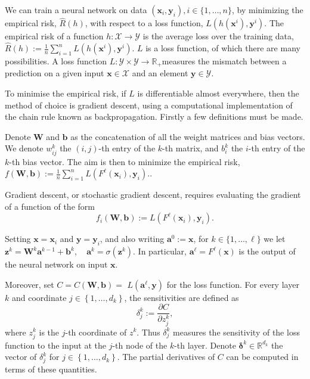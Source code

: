 \documentclass[a4paper,11pt]{article}
\theoremstyle{plain} %
\theoremstyle{definition} %
\theoremstyle{remark} %
\begin{document}
We can train a neural network on data $\left(\boldsymbol{x}_i, \boldsymbol{y}_i\right), i \in\{1, \ldots, n\}$, by minimizing the empirical risk, $
\hat{R}(h)$, with respect to a loss function, $L\left(h\left(\boldsymbol{x}^i\right), \boldsymbol{y}^i\right)$. The empirical risk of a function $h: \mathcal{X} \rightarrow \mathcal{Y}$ is the average loss over the training data,
$
\hat{R}(h):=\frac{1}{n} \sum_{i=1}^n L\left(h\left(\boldsymbol{x}^i\right), \boldsymbol{y}^i\right)
$. $L$ is a loss function, of which there are many possibilities. A loss function $L: \mathcal{Y} \times \mathcal{Y} \rightarrow \mathbb{R}_{+}$measures the mismatch between a prediction on a given input $\boldsymbol{x} \in \mathcal{X}$ and an element $\boldsymbol{y} \in \mathcal{Y}$. 

To minimise the empirical risk, if $L$ is differentiable almost everywhere, then the method of choice is gradient descent, using a computational implementation of the chain rule known as backpropagation. Firstly a few definitions must be made. 

Denote $\boldsymbol{W}$ and $\boldsymbol{b}$ as the concatenation of all the weight matrices and bias vectors. We denote $w_{i j}^k$ the $(i, j)$-th entry of the $k$-th matrix, and $b_i^k$ the $i$-th entry of the $k$-th bias vector. The aim is then to minimize the empirical risk,
$
f(\boldsymbol{W}, \boldsymbol{b}):=\frac{1}{n} \sum_{i=1}^n L\left(F^{\ell}\left(\boldsymbol{x}_i\right), \boldsymbol{y}_i\right) .
$.

Gradient descent, or stochastic gradient descent, requires evaluating the gradient of a function of the form
$$
f_i(\boldsymbol{W}, \boldsymbol{b}):=L\left(F^{\ell}\left(\boldsymbol{x}_i\right), \boldsymbol{y}_i\right) .
$$

Setting $\boldsymbol{x}=\boldsymbol{x}_i$ and $\boldsymbol{y}=\boldsymbol{y}_i$, and also writing $\boldsymbol{a}^0:=\boldsymbol{x}$,  for $k \in\{1, \ldots, \ell\}$ we let
$
\boldsymbol{z}^k=\boldsymbol{W}^k \boldsymbol{a}^{k-1}+\boldsymbol{b}^k, \quad \boldsymbol{a}^k=\sigma\left(\boldsymbol{z}^k\right) .
$
In particular, $\boldsymbol{a}^{\ell}=F^{\ell}(\boldsymbol{x})$ is the output of the neural network on input $\boldsymbol{x}$. 

Moreover, set $C=C(\boldsymbol{W}, \boldsymbol{b})=$ $L\left(\boldsymbol{a}^{\ell}, \boldsymbol{y}\right)$ for the loss function.
For every layer $k$ and coordinate $j \in\left\{1, \ldots, d_k\right\}$, the sensitivities are defined as
$$
\delta_j^k:=\frac{\partial C}{\partial z_j^k},
$$
where $z_j^k$ is the $j$-th coordinate of $z^k$. Thus $\delta_j^k$ measures the sensitivity of the loss function to the input at the $j$-th node of the $k$-th layer. Denote $\boldsymbol{\delta}^k \in \mathbb{R}^{d_k}$ the vector of $\delta_j^k$ for $j \in\left\{1, \ldots, d_k\right\}$. The partial derivatives of $C$ can be computed in terms of these quantities.
\end{document}
